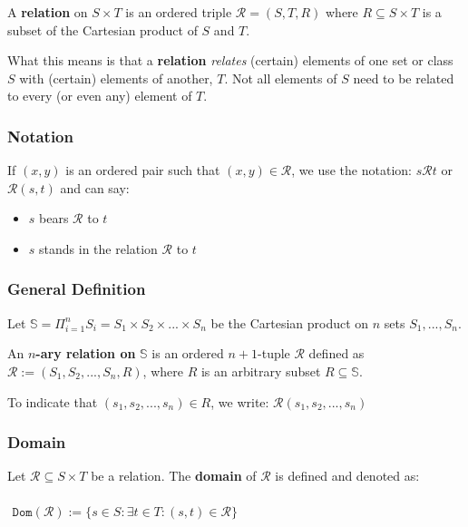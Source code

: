 A \textbf{relation} on $S \times T$ is an ordered triple
$ \mathcal{R} = (S, T, R) $ where $R \subseteq S \times T$ is a
subset of the Cartesian product of $S$ and $T$.

What this means is that a \textbf{relation} \textit{relates} (certain)
elements of one set or class $S$ with (certain) elements of another,
$T$. Not all elements of $S$ need to be related to every (or even any)
element of $T$.

\subsubsection{Notation}

If $(x, y)$ is an ordered pair such that $(x, y) \in \mathcal{R}$, we
use the notation: $ s \mathcal{R} t$ or $ \mathcal{R}(s, t)$ and can
say:
\begin{itemize}
\item $s$ bears $\mathcal{R}$ to $t$
\item $s$ stands in the relation $\mathcal{R}$ to $t$
\end{itemize}

\subsubsection{General Definition}
Let
$\mathbb{S} = \Pi^n_{i=1}S_i = S_1 \times S_2 \times ... \times S_n $
be the Cartesian product on $n$ sets $S_1, ..., S_n$.

An \textbf{$n$-ary relation on} $\mathbb{S}$ is an ordered
$n+1$-tuple $\mathcal{R}$ defined as
$\mathcal{R} := (S_1, S_2, ..., S_n, R)$, where $R$ is an arbitrary
subset $R \subseteq \mathbb{S}$.

To indicate that $(s_1, s_2, ..., s_n) \in R$, we
write: $\mathcal{R}(s_1, s_2, ..., s_n)$

\subsubsection{Domain}
\label{sec:domain}

Let $\mathcal{R} \subseteq S \times T$ be a relation. The
\textbf{domain} of $\mathcal{R}$ is defined and denoted as:

\begin{math}
  \begin{array}{c}
    \\
    \mathtt{Dom}(\mathcal{R}) := \{ s \in S: \exists t \in T: (s, t) \in \mathcal{R} \}\\
    \\
  \end{array}
\end{math}

